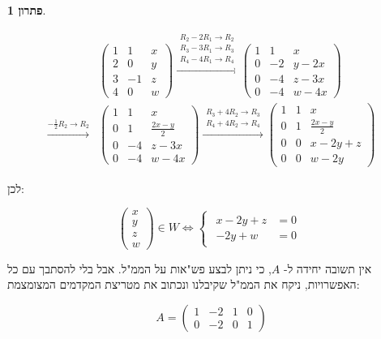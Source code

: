 \documentclass[12pt]{report}
\theoremstyle{plain}
\theoremstyle{definition}
\newtheorem*{solution}{פתרון}
\newcommand{\0}{\mathbf{0}}
\begin{document}
\begin{solution}
\begin{enumerate}[label=\alph*.]
$$
\begin{aligned}
&\left(
\begin{array}{cc|c}
1 & 1 & x \\
2 & 0 & y \\
3 & -1 & z \\
4 & 0 & w
\end{array}
\right)
\xrightarrow{
\substack{
R_2-2R_1\to R_2\\
R_3-3R_1\to R_3\\
R_4-4R_1\to R_4
}
}
\left(
\begin{array}{cc|c}
1 & 1 & x \\
0 & -2 & y-2x \\
0 & -4 & z-3x \\
0 & -4 & w-4x
\end{array}
\right)\\
\xrightarrow{
-\frac12 R_2\to R_2
}
&\left(
\begin{array}{cc|c}
1 & 1 & x \\
0 & 1 & \frac{2x-y}{2} \\
0 & -4 & z-3x \\
0 & -4 & w-4x
\end{array}
\right)\xrightarrow{
\substack{
R_3+4R_2\to R_3\\
R_4+4R_2\to R_4
}
}
\left(
\begin{array}{cc|c}
1 & 1 & x \\
0 & 1 & \frac{2x-y}{2} \\
0 & 0 & x-2y+z \\
0 & 0 & w-2y
\end{array}
\right)
\end{aligned}
$$

לכן:

$$
\begin{pmatrix}
x \\
y \\
z \\
w 
\end{pmatrix}\in W \iff 
\begin{cases} 
\begin{aligned}
x-2y+z&=0 \\
-2y+w&=0
\end{aligned}
\end{cases}
$$

אין תשובה יחידה ל-
$A$,
כי ניתן לבצע פש"אות על הממ"ל. אבל בלי להסתבך עם כל האפשרויות, ניקח את הממ"ל שקיבלנו ונכתוב את מטריצת המקדמים המצומצמת:

$$
A=\begin{pmatrix}
1 & -2 & 1 & 0 \\
0 & -2 & 0 & 1
\end{pmatrix}
$$


\end{enumerate}
\end{solution}
\end{document}

